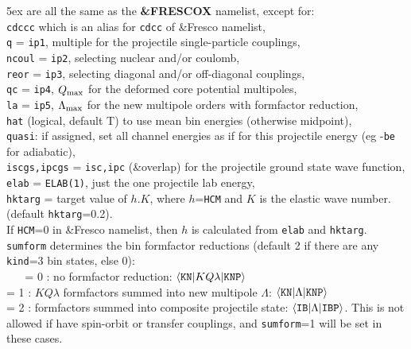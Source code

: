 \documentclass[11pt]{article}
\begin{document}
\vspace{-3mm}
\hangindent 5ex
are all the same as the {\bf \&FRESCOX} namelist, except for:\\
{\tt cdccc} which is an alias for {\tt cdcc} of \&Fresco namelist,\\
{\tt q} = {\tt ip1}, multiple for the projectile single-particle couplings,\\
{\tt ncoul} = {\tt ip2}, selecting nuclear and/or coulomb,\\
{\tt reor} = {\tt ip3}, selecting diagonal and/or off-diagonal couplings,\\
{\tt qc} = {\tt ip4}, $Q_{\rm max}$ for the deformed core potential multipoles,\\
{\tt la} = {\tt ip5}, $\Lambda_{\rm max}$ for the new multipole orders with formfactor reduction,\\
{\tt hat} (logical, default T) to use mean bin energies (otherwise midpoint),\\
{\tt quasi}: if assigned, set all channel energies as if for this projectile
energy (eg -{\tt be} for adiabatic),\\
{\tt iscgs,ipcgs} = {\tt isc,ipc} (\&overlap) for the projectile ground state wave
function,\\
{\tt elab} = {\tt ELAB(1)}, just the one projectile lab energy,\\
{\tt hktarg} = target value of $h.K$, where $h$={\tt HCM} and $K$ is the elastic wave number.
(default {\tt hktarg}=0.2). \\
\hspace*{1cm} If {\tt HCM}=0 in \&Fresco namelist,
then $h$ is calculated from {\tt elab} and {\tt hktarg}.\\



{\tt sumform} determines the bin formfactor reductions
(default 2 if there are any {\tt kind}=3 bin states, else 0):\\
~ ~   = 0 : no formfactor reduction:
     $\langle {\tt KN} | K Q \lambda | {\tt KNP} \rangle$
\\    = 1 : $KQ\lambda$ formfactors summed into new multipole $\Lambda$:
     $\langle {\tt KN} | \Lambda | {\tt KNP} \rangle$
\\    = 2 : formfactors summed into composite projectile state:
     $\langle {\tt IB} | {\Lambda} | {\tt IBP} \rangle$.
      This is not allowed if have spin-orbit or transfer couplings, and
      {\tt sumform}=1 will be set in these cases.\\
\end{document}
